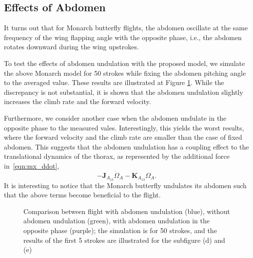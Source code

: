 \documentclass[conf]{new-aiaa}
\begin{document}
\subsection{Effects of Abdomen}

It turns out that for Monarch butterfly flights, the abdomen oscillate at the same frequency of the wing flapping angle with the opposite phase,
i.e., the abdomen rotates downward during the wing upstrokes. 

To test the effects of abdomen undulation with the proposed model, we simulate the above Monarch model for 50 strokes while fixing the abdomen pitching angle to the averaged value. 
These results are illustrated at Figure \ref{fig:comp_ab}.
While the discrepancy is not substantial, it is shown that the abdomen undulation slightly increases the climb rate and the forward velocity.  

Furthermore, we consider another case when the abdomen undulate in the opposite phase to the measured vales.
Interestingly, this yields the worst results, where the forward velocity and the climb rate are smaller than the case of fixed abdomen. 
This suggests that the abdomen undulation has a coupling effect to the translational dynamics of the thorax, as represented by the additional force in~\eqref{eqn:mx_ddot},
\[
    -\mathbf{J}_{A_{13}}\dot\Omega_A - \mathbf{K}_{A_{13}}\Omega_A.
\]
It is interesting to notice that the Monarch butterfly undulates its abdomen such that the above terms become beneficial to the flight. 


\begin{figure}[p]
    \centerline{
        \hfill
    }
    \centerline{
        \hfill
    }
    \centerline{
    }
    \caption{Comparison between flight with abdomen undulation (blue), without abdomen undulation (green), with abdomen undulation in the opposite phase (purple); the simulation is for 50 strokes, and the results of the first 5 strokes are illustrated for the subfigure (d) and (e)}\label{fig:comp_ab}
\end{figure}
\end{document}
